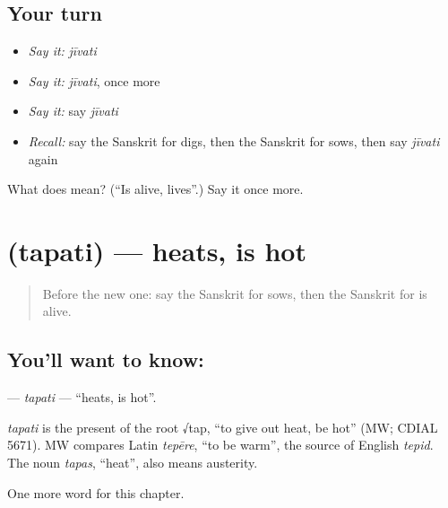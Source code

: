 \subsection*{Your turn}
\begin{itemize}
\raggedright
  \item \emph{Say it:} \emph{jīvati}
  \item \emph{Say it:} \emph{jīvati}, once more
  \item \emph{Say it:} say \emph{jīvati}
  \item \emph{Recall:} say the Sanskrit for digs, then the Sanskrit for sows, then say \emph{jīvati} again
\end{itemize}

\begin{tcolorbox}[breakable,colback=teal!4,colframe=teal!35!black,title={Before you move on}]
What does  mean? (\textquotedblleft{}Is alive, lives\textquotedblright{}.) Say it once more.
\end{tcolorbox}
\section[\texorpdfstring{\sk{तपति} (tapati)}{तपति (tapati)}]{ (tapati) — heats, is hot}

\label{lesson:SA-C204-tapati}



\begin{quote}
Before the new one: say the Sanskrit for sows, then the Sanskrit for is alive.
\end{quote}

\subsection*{You'll want to know: }
\textbf{} — \emph{tapati} — \textquotedblleft{}heats, is hot\textquotedblright{}.

\begin{cousinweb}
\emph{tapati} is the present of the root √tap, \textquotedblleft{}to give out heat, be hot\textquotedblright{} (MW; CDIAL 5671). MW compares Latin \emph{tepēre}, \textquotedblleft{}to be warm\textquotedblright{}, the source of English \emph{tepid}. The noun \emph{tapas}, \textquotedblleft{}heat\textquotedblright{}, also means austerity.
\end{cousinweb}

\begin{grammarlens}[title={What you've built}]
One more word for this chapter.
\end{grammarlens}


